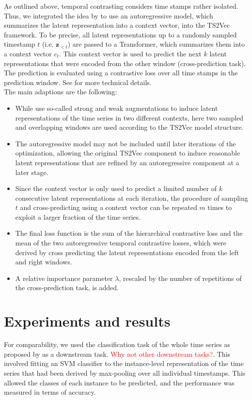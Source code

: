 \documentclass{article}
\begin{document}
As outlined above, temporal contrasting considers time stamps rather isolated. Thus, we integrated the idea by \citet{tstcc} to use an autoregressive model, which summarizes the latent representation into a context vector, into the TS2Vec framework. To be precise, all latent representations up to a randomly sampled timestamp $t$ (i.e. $\boldsymbol{z}_{<t}$) are passed to a Transformer, which summarizes them into a context vector $c_{t}$. This context vector is used to predict the next $k$ latent representations that were encoded from the other window (cross-prediction task). The prediction is evaluated using a contrastive loss over all time stamps in the prediction window. See \citet{tstcc} for more technical details. \\

The main adaptions are the following:
\begin{itemize}
\item While \citet{tstcc} use so-called strong and weak augmentations to induce latent representations of the time series in two different contexts, here two sampled and overlapping windows are used according to the TS2Vec model structure.
\item The autoregressive model may not be included until later iterations of the optimization, allowing the original TS2Vec component to induce reasonable latent representations that are refined by an autoregressive component at a later stage.
\item Since the context vector is only used to predict a limited number of $k$ consecutive latent representations at each iteration, the procedure of sampling $t$ and cross-predicting using a context vector can be repeated $m$ times to exploit a larger fraction of the time series.
\item The final loss function is the sum of the hierarchical contrastive loss and the mean of the two autoregressive temporal contrastive losses, which were derived by cross predicting the latent representations encoded from the left and right windows.
\item A relative importance parameter $\lambda$, rescaled by the number of repetitions of the cross-prediction task, is added.
\end{itemize}

\section{Experiments and results}

For comparability, we used the classification task of the whole time series as proposed by \citet{ts2vec} as a downstream task. \textcolor{red}{Why not other downstream tasks?}. This involved fitting an SVM classifier to the instance-level representation of the time series that had been derived by max-pooling over all individual timestamps. This allowed the classes of each instance to be predicted, and the performance was measured in terms of accuracy. \\
\end{document}
